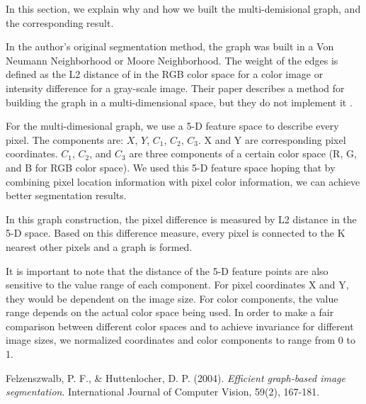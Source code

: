 \documentclass[12pt, english, titlepage]{article}
\begin{document}
In this section, we explain why and how we built the multi-demisional graph, and the corresponding result.

In the author's original segmentation method, the graph was built in a Von Neumann Neighborhood or Moore Neighborhood. The weight of the edges is defined as the L2 distance of in the RGB color space for a color image or intensity difference for a gray-scale image. Their paper describes a method for building the graph in a multi-dimensional space, but they do not implement it \cite{paper}.

For the multi-dimesional graph, we use a 5-D feature space to describe every pixel. The components are: $X$, $Y$, $C_1$, $C_2$, $C_3$. X and Y are corresponding pixel coordinates. $C_1$, $C_2$, and $C_3$ are three components of a certain color space (R, G, and B for RGB color space). We used this 5-D feature space hoping that by combining pixel location information with pixel color information, we can achieve better segmentation results.

In this graph construction, the pixel difference is measured by L2 distance in the 5-D space. Based on this difference measure, every pixel is connected to the K nearest other pixels and a graph is formed.

It is important to note that the distance of the 5-D feature points are also sensitive to the value range of each component. For pixel coordinates X and Y, they would be dependent on the image size. For color components, the value range depends on the actual color space being used. In order to make a fair comparison between different color spaces and to achieve invariance for different image sizes, we normalized coordinates and color components to range from 0 to 1.

\begin{thebibliography}{1}
\small

Felzenszwalb, P. F., \& Huttenlocher, D. P. (2004).
	\emph{Efficient graph-based image segmentation}.
	International Journal of Computer Vision, 59(2), 167-181.

\end{thebibliography}
\end{document}
